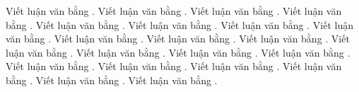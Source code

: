   Viết luận văn bằng  . Viết luận văn bằng  . Viết luận văn bằng  . Viết luận văn bằng  . Viết luận văn bằng  . Viết luận văn bằng  . Viết luận văn bằng  . Viết luận văn bằng  . Viết luận văn bằng  . Viết luận văn bằng  . Viết luận văn bằng  . Viết luận văn bằng  . Viết luận văn bằng  . Viết luận văn bằng  . Viết luận văn bằng  . Viết luận văn bằng  . Viết luận văn bằng  . Viết luận văn bằng  . Viết luận văn bằng  . Viết luận văn bằng  . Viết luận văn bằng  . 
  
  
 
\begin{figure} 
\centering
{}
\end{figure}
